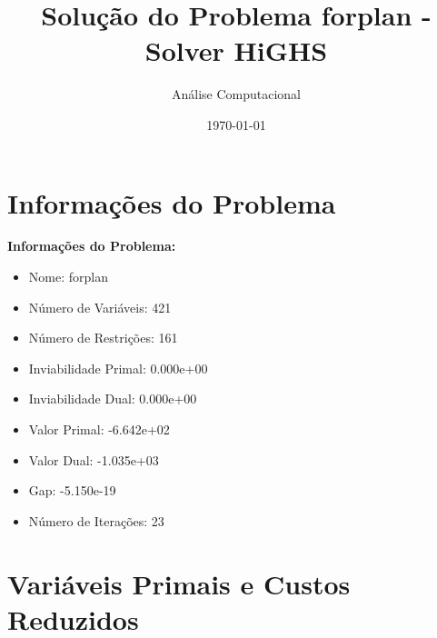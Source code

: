 \documentclass[12pt]{article}
\title{Solução do Problema forplan - Solver HiGHS}
\author{Análise Computacional}
\date{\today}
\begin{document}
\maketitle

\section{Informações do Problema}

\textbf{Informações do Problema:}
\begin{itemize}
\item Nome: forplan
\item Número de Variáveis: 421
\item Número de Restrições: 161
\item Inviabilidade Primal: 0.000e+00
\item Inviabilidade Dual: 0.000e+00
\item Valor Primal: -6.642e+02
\item Valor Dual: -1.035e+03
\item Gap: -5.150e-19
\item Número de Iterações: 23
\end{itemize}


\section{Variáveis Primais e Custos Reduzidos}
\end{document}
